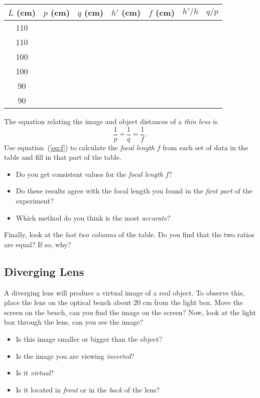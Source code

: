 \documentclass[11pt, a4paper]{article}
\begin{document}
\begin{center}
    \def\arraystretch{1.5}
    \setlength\tabcolsep{0.6cm}
    \begin{tabular}{|c|c|c|c|c|c|c|}
        \hline
        \rowcolor{gray!40}
        $L$ (cm) & $p$ (cm) & $q$ (cm) & $h'$ (cm) & $f$ (cm) & $h'/h$ & $q/p$ \\
        \hline
        110 & ~ & ~ & ~ & ~ & ~ & ~ \\
        \hline
        110 & ~ & ~ & ~ & ~ & ~ & ~ \\
        \hline
        100 & ~ & ~ & ~ & ~ & ~ & ~ \\
        \hline
        100 & ~ & ~ & ~ & ~ & ~ & ~ \\
        \hline
        90 & ~ & ~ & ~ & ~ & ~ & ~ \\
        \hline
        90 & ~ & ~ & ~ & ~ & ~ & ~ \\
        \hline
    \end{tabular}
\end{center}

The equation relating the image and object distances of a \textit{thin lens} is
\begin{equation}
    \frac{1}{p} + \frac{1}{q} = \frac{1}{f}\,.
    \label{eq:f}
\end{equation}
Use equation~(\ref{eq:f}) to calculate the \textit{focal length} $f$ from each set of data in the table
and fill in that part of the table.
\begin{itemize}
    \item Do you get consistent values for the \textit{focal length} $f$?
    \item Do these results agree with the focal length you found in the \textit{first part} of the experiment?
    \item Which method do you think is the most \textit{accurate}?
\end{itemize}
\fillwithlines{3cm}
Finally, look at the \textit{last two columns} of the table.
Do you find that the two ratios are equal?
If so, why?
\fillwithlines{3cm}
\subsection{Diverging Lens}
A diverging lens will produce a virtual image of a real object. 
To observe this, place the lens on the optical bench about 20 cm from the light
box.
Move the screen on the bench, can you find the image on the screen?
Now, look at the light box through the lens, can you see the image?
\begin{itemize}
    \item Is this image smaller or bigger than the object?
    \item Is the image you are viewing \textit{inverted}?
    \item Is it \textit{virtual}?
    \item Is it located in \textit{front} or in the \textit{back} of the lens?
\end{itemize}
\fillwithlines{3cm}
\end{document}
